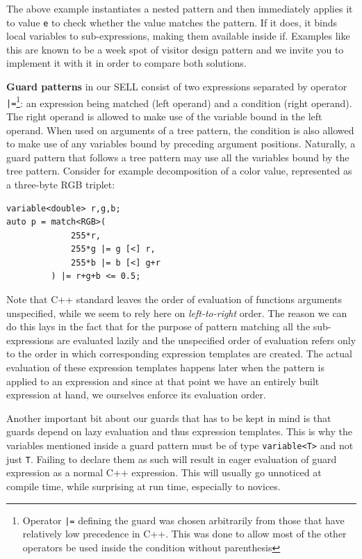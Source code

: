 \documentclass[preprint]{sigplanconf}
\makeatletter
\DeclareRobustCommand{\code}[1]{{\lstinline[breaklines=false,escapechar=@]{#1}}}
\makeatother
\begin{document}
\noindent
The above example instantiates a nested pattern and then immediately applies it 
to value \code{e} to check whether the value matches the pattern. If it does, 
it binds local variables to sub-expressions, making them available inside if.
Examples like this are known to be a week spot of visitor design pattern and we 
invite you to implement it with it in order to compare both solutions.

{\bf Guard patterns} in our SELL consist of two expressions separated by operator 
\code{|=}\footnote{Operator \code{|=} defining the guard was chosen arbitrarily 
from those that have relatively low precedence in C++. This was done to allow 
most of the other operators be used inside the condition without parenthesis}: 
an expression being matched (left operand) and a condition (right operand). The 
right operand is allowed to make use of the variable bound in the left operand. 
When used on arguments of a tree pattern, the condition is also allowed to make 
use of any variables bound by preceding argument positions. Naturally, a guard 
pattern that follows a tree pattern may use all the variables bound by the tree 
pattern. Consider for example decomposition of a color value, represented as a 
three-byte RGB triplet:

\begin{lstlisting}[keepspaces,columns=flexible]
variable<double> r,g,b;
auto p = match<RGB>( 
             255*r, 
             255*g |= g [<] r, 
             255*b |= b [<] g+r
         ) |= r+g+b <= 0.5;
\end{lstlisting}

\noindent
Note that C++ standard leaves the order of evaluation of functions arguments 
unspecified\cite[.6]{C++0x}, while we seem to rely here on 
\emph{left-to-right} order. The reason we can do this lays in the fact that for 
the purpose of pattern matching all the sub-expressions are evaluated lazily and 
the unspecified order of evaluation refers only to the order in which 
corresponding expression templates are created. The actual evaluation of these 
expression templates happens later when the pattern is applied to an expression 
and since at that point we have an entirely built expression at hand, we 
ourselves enforce its evaluation order.

Another important bit about our guards that has to be kept in mind is that 
guards depend on lazy evaluation and thus expression templates. This is why the 
variables mentioned inside a guard pattern must be of type \code{variable<T>} 
and not just \code{T}. Failing to declare them as such will result in eager 
evaluation of guard expression as a normal C++ expression. This will usually go 
unnoticed at compile time, while surprising at run time, especially to novices.
\end{document}
